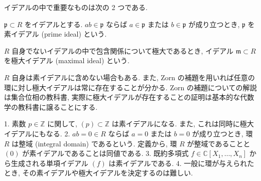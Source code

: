 \documentclass[openany, a4paper, oneside]{jsbook}
\begin{document}
イデアルの中で重要なものは次の 2 つである.
\begin{defn}[素イデアル]
$\mathfrak{p} \subset R$ をイデアルとする.
$ab \in \mathfrak{p}$ ならば $a\in \mathfrak{p}$ または $b \in \mathfrak{p}$ が成り立つとき, $\mathfrak{p}$ を素イデアル (prime ideal) という. \fin
\end{defn}
\begin{defn}[極大イデアル]
$R$ 自身でないイデアルの中で包含関係について極大であるとき, イデアル $\mathfrak{m} \subset R$ を極大イデアル (maximal ideal) という. \fin
\end{defn}
\begin{rem}
$R$ 自身は素イデアルに含めない場合もある.
また, Zorn の補題を用いれば任意の環に対し極大イデアルは常に存在することが分かる.
Zorn の補題についての解説は集合位相の教科書, 実際に極大イデアルが存在することの証明は基本的な代数学の教科書に譲ることにする. \fin
\end{rem}
\begin{ex}
1. 素数 $p \in \mathbb{Z}$ に関して, $(p) \subset \mathbb{Z}$ は素イデアルになる.
   また, これは同時に極大イデアルにもなる.
2. $ab = 0 \in R$ ならば $a=0$ または $b=0$ が成り立つとき, 環 $R$ は整域 (integral domain) であるという.
   定義から, 環 $R$ が整域であることと $(0)$ が素イデアルであることは同値である.
3. 既約多項式 $f \in \mathbb{C}[X_1,\dots,X_n]$ から生成される単項イデアル $(f)$ は素イデアルである.
4. 一般に環が与えられたとき, その素イデアルや極大イデアルを決定するのは難しい. \fin
\end{ex}
\end{document}
